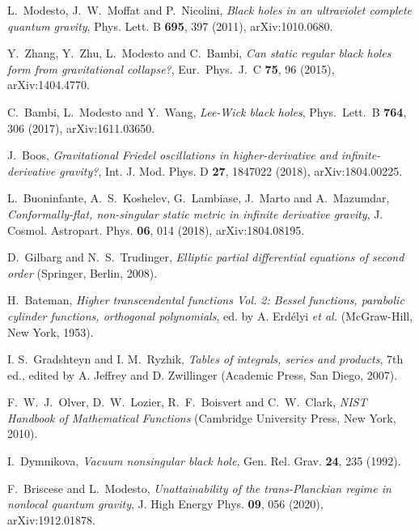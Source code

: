 \documentclass[aps,prd,a4paper,twocolumn,showpacs,showkeys,preprintnumbers,amsmath,amssymb,nofootinbib]{revtex4-2}
\numberwithin{equation}{section}
\begin{document}
\begin{thebibliography}{}
L.~Modesto, J.~W.~Moffat and P.~Nicolini,
{\it Black holes in an ultraviolet complete quantum gravity},
Phys. Lett. B \textbf{695}, 397 (2011),
arXiv:1010.0680.

Y.~Zhang, Y.~Zhu, L.~Modesto and C.~Bambi,
{\it Can static regular black holes form from gravitational collapse?},
Eur.\ Phys.\ J.\ C {\bf 75}, 96 (2015),
arXiv:1404.4770.

C.~Bambi, L.~Modesto and Y.~Wang,
{\it Lee-Wick black holes},
Phys.\ Lett.\ B {\bf 764}, 306 (2017),
arXiv:1611.03650.

J.~Boos,
{\it Gravitational Friedel oscillations in higher-derivative and infinite-derivative gravity?},
Int. J. Mod. Phys. D \textbf{27}, 1847022 (2018),
arXiv:1804.00225.

L.~Buoninfante, A.~S.~Koshelev, G.~Lambiase, J.~Marto and A.~Mazumdar,
{\it Conformally-flat, non-singular static metric in infinite derivative gravity},
J. Cosmol. Astropart. Phys. \textbf{06}, 014 (2018),
arXiv:1804.08195.

D.~Gilbarg and N.~S.~Trudinger,
{\it Elliptic partial differential equations of second order}
(Springer, Berlin, 2008).

H.~Bateman,  
{\it Higher transcendental functions Vol. 2: Bessel functions, parabolic cylinder functions, orthogonal polynomials},
ed. by A. Erd\'elyi {\it et al.} (McGraw-Hill, New York, 1953).

I. S.~Gradshteyn and I. M.~Ryzhik,
{\it Tables of integrals, series and products}, 7th ed.,
edited by A. Jeffrey and D. Zwillinger
(Academic Press, San Diego, 2007).

F.~W.~J.~Olver, D.~W.~Lozier, R.~F.~Boisvert and C.~W.~Clark,
{\it {NIST} Handbook of Mathematical Functions}
(Cambridge University Press, New York, 2010).

I.~Dymnikova,
{\it Vacuum nonsingular black hole},
Gen. Rel. Grav. \textbf{24}, 235 (1992).

F.~Briscese and L.~Modesto,
{\it Unattainability of the trans-Planckian regime in nonlocal quantum gravity}, 
J. High Energy Phys. \textbf{09}, 056 (2020),
arXiv:1912.01878. 

\end{thebibliography}
\end{document}
